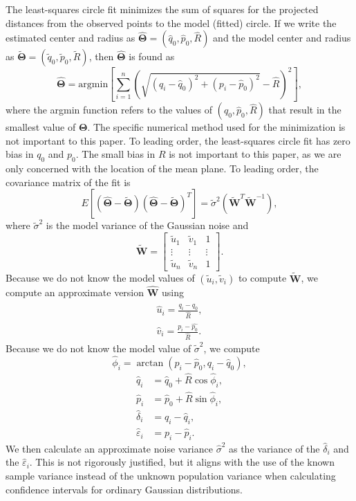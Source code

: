 \documentclass[a4paper,fleqn]{cas-sc}
\begin{document}
\begin{linenumbers}
The least-squares circle fit minimizes the sum of squares for the projected distances from the observed points to the model (fitted) circle.
If we write the estimated center and radius as $\hat{\mathbf{\Theta}}=(\hat{q}_0,\hat{p}_0,\hat{R})$ and the model center and radius as $\tilde{\mathbf{\Theta}}=(\tilde{q}_0,\tilde{p}_0,\tilde{R})$, then $\hat{\mathbf{\Theta}}$ is found as
\begin{equation}
\hat{\mathbf{\Theta}}=\mathrm{argmin}\left[\sum_{i=1}^n \left(\sqrt{(q_i-\hat{q}_0)^2+(p_i-\hat{p}_0)^2}-\hat{R}\right)^2\right],
\end{equation}
where the argmin function refers to the values of $(\hat{q}_0,\hat{p}_0,\hat{R})$ that result in the smallest value of $\mathbf{\Theta}$.
The specific numerical method used for the minimization is not important to this paper.
To leading order, the least-squares circle fit has zero bias in $q_0$ and $p_0$.
The small bias in $R$ is not important to this paper, as we are only concerned with the location of the mean plane.
To leading order, the covariance matrix of the fit is 
\begin{equation}
E[(\hat{\mathbf{\Theta}}-\tilde{\mathbf{\Theta}})(\hat{\mathbf{\Theta}}-\tilde{\mathbf{\Theta}})^T]=\tilde{\sigma}^2(\mathbf{\tilde{W}}^T\mathbf{\tilde{W}}^{-1}),
\end{equation}
where $\tilde{\sigma}^2$ is the model variance of the Gaussian noise and 
\begin{equation}
\mathbf{\tilde{W}}=
\begin{bmatrix}
\tilde{u}_1 & \tilde{v}_1 & 1 \\
\vdots & \vdots & \vdots \\
\tilde{u}_n & \tilde{v}_n & 1
\end{bmatrix}.
\end{equation}
Because we do not know the model values of $(\tilde{u}_i,\tilde{v}_i)$ to compute $\mathbf{\tilde{W}}$, we compute an approximate version $\mathbf{\hat{W}}$ using
\begin{align}
\hat{u}_i=\frac{q_i-\hat{q_0}}{\hat{R}},\\
\hat{v}_i=\frac{p_i-\hat{p_0}}{\hat{R}}.
\end{align}
Because we do not know the model value of $\tilde{\sigma}^2$, we compute
\begin{equation}
\hat{\phi}_i=\arctan(p_i-\hat{p}_0,q_i-\hat{q}_0),
\end{equation}
\begin{align}
\hat{q}_i &= \hat{q}_0+\hat{R}\cos{\hat{\phi}_i},\\
\hat{p}_i &= \hat{p}_0+\hat{R}\sin{\hat{\phi}_i},\\
\hat{\delta}_i &= q_i - \hat{q}_i,\\
\hat{\varepsilon}_i &= p_i - \hat{p}_i.
\end{align}
We then calculate an approximate noise variance $\hat{\sigma}^2$ as the variance of the $\hat{\delta}_i$ and the $\hat{\varepsilon}_i$.
This is not rigorously justified, but it aligns with the use of the known sample variance instead of the unknown population variance when calculating confidence intervals for ordinary Gaussian distributions.


\end{linenumbers}
\end{document}

